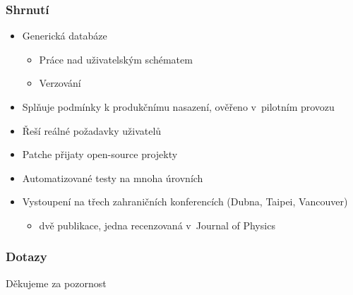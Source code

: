 \documentclass{beamer}
\begin{document}
\begin{frame}[fragile]
\frametitle{Shrnutí}
\begin{itemize}
    \item Generická databáze
        \begin{itemize}
            \item Práce nad uživatelským schématem
            \item Verzování
        \end{itemize}
    \item Splňuje podmínky k produkčnímu nasazení, ověřeno v~pilotním provozu
    \item Řeší reálné požadavky uživatelů
    \item Patche přijaty open-source projekty
    \item Automatizované testy na mnoha úrovních
    \item Vystoupení na třech zahraničních konferencích (Dubna, Taipei, Vancouver)
        \begin{itemize}
            \item dvě publikace, jedna recenzovaná v~Journal of Physics
        \end{itemize}
\end{itemize}
\end{frame}


\begin{frame}[fragile]
\frametitle{Dotazy}
\begin{center}
    Děkujeme za pozornost
\end{center}
\end{frame}
\end{document}
